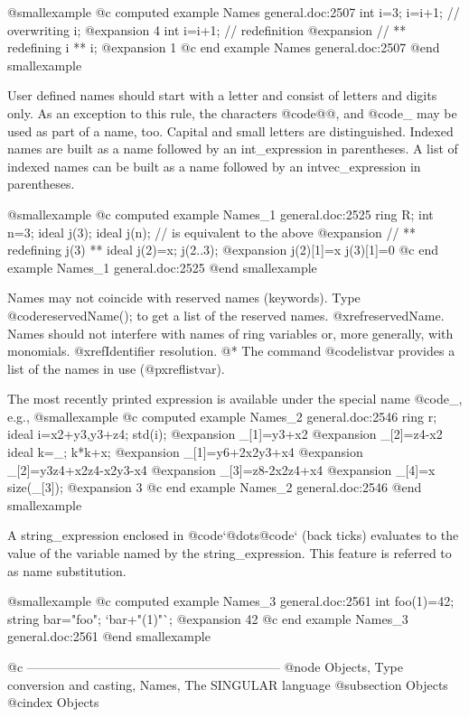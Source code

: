 {{{@smallexample
@c computed example Names general.doc:2507 
  int i=3;
  i=i+1;        // overwriting
  i;
@expansion{} 4
  int i=i+1;    // redefinition
@expansion{} // ** redefining i **
  i;
@expansion{} 1
@c end example Names general.doc:2507
@end smallexample

User defined names should start with a letter and consist of letters and
digits only.  As an exception to this rule, the characters @code{@@},
and @code{_} may
be used as part of a name, too.  Capital and small letters are
distinguished.  Indexed names are built as a name followed by an
int_expression in parentheses.  A list of indexed names can be built as
a name followed by an intvec_expression in parentheses.

@smallexample
@c computed example Names_1 general.doc:2525 
  ring R;
  int n=3;
  ideal j(3);
  ideal j(n);     // is equivalent to the above
@expansion{} // ** redefining j(3) **
  ideal j(2)=x;
  j(2..3);
@expansion{} j(2)[1]=x j(3)[1]=0
@c end example Names_1 general.doc:2525
@end smallexample

Names may not coincide with reserved names (keywords).  Type
@code{reservedName();} to get a list of the reserved names.
@xref{reservedName}.  Names should not interfere with names of ring
variables or, more generally, with monomials.  @xref{Identifier
resolution}.
@* The command @code{listvar} provides a list of the names in use
(@pxref{listvar}).

The most recently printed expression is available
under the special name @code{_}, e.g.,
@smallexample
@c computed example Names_2 general.doc:2546 
  ring r;
  ideal i=x2+y3,y3+z4;
  std(i);
@expansion{} _[1]=y3+x2
@expansion{} _[2]=z4-x2
  ideal k=_;
  k*k+x;
@expansion{} _[1]=y6+2x2y3+x4
@expansion{} _[2]=y3z4+x2z4-x2y3-x4
@expansion{} _[3]=z8-2x2z4+x4
@expansion{} _[4]=x
  size(_[3]);
@expansion{} 3
@c end example Names_2 general.doc:2546
@end smallexample

A string_expression enclosed in @code{`}@dots{}@code{`} (back ticks)
evaluates to the value of the variable named by the string_expression.
This feature is referred to as name substitution.

@smallexample
@c computed example Names_3 general.doc:2561 
  int foo(1)=42;
  string bar="foo";
  `bar+"(1)"`;
@expansion{} 42
@c end example Names_3 general.doc:2561
@end smallexample

@c ------------------------------------------------------------
@node Objects, Type conversion and casting, Names, The SINGULAR language
@subsection Objects
@cindex Objects

}}}
